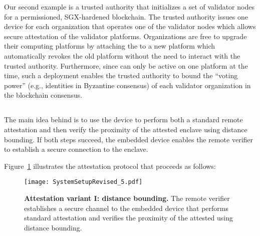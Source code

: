 Our second example is a trusted authority that initializes a set of validator nodes for a permissioned, SGX-hardened blockchain. 
The trusted authority issues one \device device for each organization that operates one of the validator nodes which allows secure attestation of the validator platforms. Organizations are free to upgrade their computing platforms by attaching the \device to a new platform which automatically revokes the old platform without the need to interact with the trusted authority. Furthermore, since \device can only be active on one platform at the time, such a deployment enables the trusted authority to bound the ``voting power'' (e.g., identities in Byzantine consensus) of each validator organization in the blockchain consensus.



\subsection{}
\label{sec:systemDesign}

 The main idea behind is to use the \device device to perform both a standard remote attestation and then verify the proximity of the attested enclave using distance bounding. If both steps succeed, the embedded device enables the remote verifier to establish a secure connection to the enclave.

\ifusenix
\vspace{-15pt}
\else
\fi
{} Figure~\ref{fig:systemSetUp} illustrates the attestation protocol that proceeds as follows:


\ifusenix

\begin{figure}[t]
 \centering
  \texttt{[image: SystemSetupRevised\_5.pdf]}
 \caption{\textbf{Attestation variant I: distance bounding.} The remote verifier establishes a secure channel to the \device embedded device that performs standard attestation and verifies the proximity of the attested using distance bounding.}
 \vspace{-2px}
 \label{fig:systemSetUp}
\end{figure}

